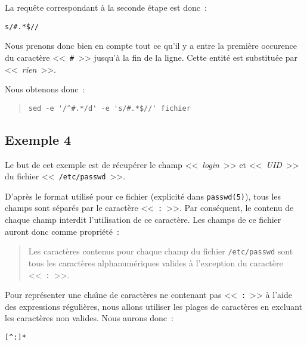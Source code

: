 La requ{\^e}te correspondant {\`a} la seconde {\'e}tape est donc~:
\begin{center}
\verb=s/#.*$//=
\end{center}
Nous prenons donc bien en compte tout ce qu'il y a entre la premi{\`e}re occurence du caract{\`e}re <<~\verb=#=~>> jusqu'{\`a} la fin de la ligne. Cette entit{\'e} est substitu{\'e}e par <<~{\sl rien}~>>.

Nous obtenons donc~:
\begin{quote}
\begin{verbatim}
sed -e '/^#.*/d' -e 's/#.*$//' fichier
\end{verbatim}
\end{quote}

\subsection{\label{adv-fltrs-sed-ex4}Exemple 4}

Le but de cet exemple est de r{\'e}cup{\'e}rer le champ <<~{\sl login}~>> et <<~{\sl UID}~>> du fichier <<~{\tt /etc/passwd}~>>.

D'apr{\`e}s le format utilis{\'e} pour ce fichier (explicit{\'e} dans {\tt passwd(5)}), tous les champs sont s{\'e}par{\'e}s par le caract{\`e}re <<~{\tt :}~>>. Par cons{\'e}quent, le contenu de chaque champ interdit l'utilisation de ce caract{\`e}re. Les champs de ce fichier auront donc comme propri{\'e}t{\'e}~:
\begin{quote}
Les caract{\`e}res contenus pour chaque champ du fichier {\tt /etc/passwd} sont
tous les caract{\`e}res alphanum{\'e}riques valides {\`a} l'exception du caract{\`e}re <<~{\tt :}~>>.
\end{quote}
Pour repr{\'e}senter une cha{\^\i}ne de caract{\`e}res ne contenant pas <<~{\tt :}~>> {\`a} l'aide des expressions r{\'e}guli{\`e}res, nous allons utiliser les plages de caract{\`e}res en excluant les caract{\`e}res non valides. Nous aurons donc~:
\begin{center}
\verb=[^:]*=\\[1ex]
\end{center}

